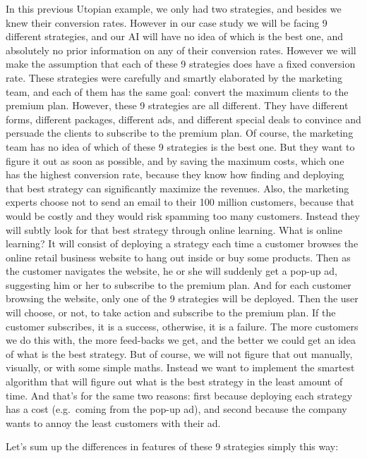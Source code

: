 \documentclass[]{book}
\begin{document}
In this previous Utopian example, we only had two strategies, and besides we knew their conversion rates. However in our case study we will be facing 9 different strategies, and our AI will have no idea of which is the best one, and absolutely no prior information on any of their conversion rates. However we will make the assumption that each of these 9 strategies does have a fixed conversion rate. These strategies were carefully and smartly elaborated by the marketing team, and each of them has the same goal: convert the maximum clients to the premium plan. However, these 9 strategies are all different. They have different forms, different packages, different ads, and different special deals to convince and persuade the clients to subscribe to the premium plan. Of course, the marketing team has no idea of which of these 9 strategies is the best one. But they want to figure it out as soon as possible, and by saving the maximum costs, which one has the highest conversion rate, because they know how finding and deploying that best strategy can significantly maximize the revenues. Also, the marketing experts choose not to send an email to their 100 million customers, because that would be costly and they would risk spamming too many customers. Instead they will subtly look for that best strategy through online learning. What is online learning? It will consist of deploying a strategy each time a customer browses the online retail business website to hang out inside or buy some products. Then as the customer navigates the website, he or she will suddenly get a pop-up ad, suggesting him or her to subscribe to the premium plan. And for each customer browsing the website, only one of the 9 strategies will be deployed. Then the user will choose, or not, to take action and subscribe to the premium plan. If the customer subscribes, it is a success, otherwise, it is a failure. The more customers we do this with, the more feed-backs we get, and the better we could get an idea of what is the best strategy. But of course, we will not figure that out manually, visually, or with some simple maths. Instead we want to implement the smartest algorithm that will figure out what is the best strategy in the least amount of time. And that's for the same two reasons: first because deploying each strategy has a cost (e.g.~coming from the pop-up ad), and second because the company wants to annoy the least customers with their ad.

\newpage

Let's sum up the differences in features of these 9 strategies simply this way:
\end{document}
